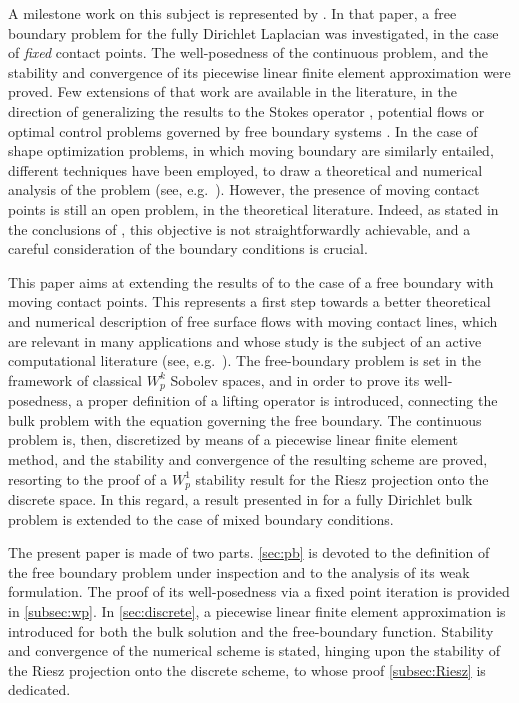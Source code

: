 \documentclass[final,hidelinks]{siamart1116Arxiv}
\numberwithin{theorem}{section}
\begin{document}
A milestone work on this subject is represented by \cite{SS91}.
In that paper, a free boundary problem for the fully Dirichlet Laplacian was investigated, in the case of {\em fixed} contact points.
The well-posedness of the continuous problem, and the stability and convergence of its piecewise linear finite element approximation were proved.
Few extensions of that work are available in the literature, in the direction of generalizing the results to the Stokes operator \cite{GiraultNochettoScott}, potential flows \cite{BaiChooChungKim} or optimal control problems governed by free boundary systems \cite{ANS14}.
In the case of shape optimization problems, in which moving boundary are similarly entailed, different techniques have been employed, to draw a theoretical and numerical analysis of the problem (see, e.g.~\cite{FPVShOpt,KinigerVexler,Eppler}).
However, the presence of moving contact points is still an open problem, in the theoretical literature.
Indeed, as stated in the conclusions of \cite{SS91}, this objective is not straightforwardly achievable, and a careful consideration of the boundary conditions is crucial.

This paper aims at extending the results of \cite{SS91} to the case of a free boundary with moving contact points.
This represents a first step towards a better theoretical and numerical description of free surface flows with moving contact lines, which are relevant in many applications and whose study is the subject of an active computational literature (see, e.g.~\cite{MovingCL,Gerbeau,Walker,Scardovelli}).
The free-boundary problem is set in the framework of classical $W^k_p$ Sobolev spaces, and in order to prove its well-posedness, a proper definition of a lifting operator is introduced, connecting the bulk problem with the equation governing the free boundary.
The continuous problem is, then, discretized by means of a piecewise linear finite element method, and the stability and convergence of the resulting scheme are proved, resorting to the proof of a $W^1_p$ stability result for the Riesz projection onto the discrete space.
In this regard, a result presented in \cite{RannacherScott} for a fully Dirichlet bulk problem is extended to the case of mixed boundary conditions.

The present paper is made of two parts.
\cref{sec:pb} is devoted to the definition of the free boundary problem under inspection and to the analysis of its weak formulation. The proof of its well-posedness via a fixed point iteration is provided in \cref{subsec:wp}.
In \cref{sec:discrete}, a piecewise linear finite element approximation is introduced for both the bulk solution and the free-boundary function.
Stability and convergence of the numerical scheme is stated, hinging upon the stability of the Riesz projection onto the discrete scheme, to whose proof \cref{subsec:Riesz} is dedicated.
\end{document}
